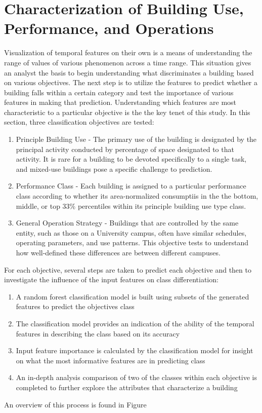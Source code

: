 \section{Characterization of Building Use, Performance, and Operations}
\label{sec:characterization}

Visualization of temporal features on their own is a means of understanding the range of values of various phenomenon across a time range. This situation gives an analyst the basis to begin understanding what discriminates a building based on various objectives. The next step is to utilize the features to predict whether a building falls within a certain category and test the importance of various features in making that prediction. Understanding which features are most characteristic to a particular objective is the the key tenet of this study. In this section, three classification objectives are tested: 

\begin{enumerate}
\item Principle Building Use - The primary use of the building is designated by the principal activity conducted by percentage of space designated to that activity. It is rare for a building to be devoted specifically to a single task, and mixed-use buildings pose a specific challenge to prediction.
\item Performance Class - Each building is assigned to a particular performance class according to whether its area-normalized consumptiis in the the bottom, middle, or top 33\% percentiles within its principle building use type class.
\item General Operation Strategy - Buildings that are controlled by the same entity, such as those on a University campus, often have similar schedules, operating parameters, and use patterns. This objective tests to understand how well-defined these differences are between different campuses.
\end{enumerate}

For each objective, several steps are taken to predict each objective and then to investigate the influence of the input features on class differentiation:
\begin{enumerate}
\item A random forest classification model is built using subsets of the generated features to predict the objectives class
\item The classification model provides an indication of the ability of the temporal features in describing the class based on its accuracy
\item Input feature importance is calculated by the classification model for insight on what the most informative features are in predicting class
\item An in-depth analysis comparison of two of the classes within each objective is completed to further explore the attributes that characterize a building
\end{enumerate}

An overview of this process is found in Figure 
